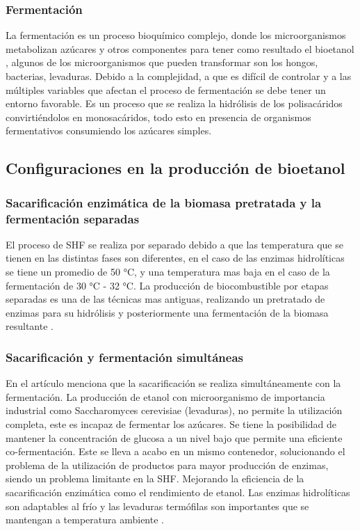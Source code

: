 \documentclass[12pt]{article}
\begin{document}
		
		
		\subsubsection{Fermentación}
		La fermentación es un proceso bioquímico complejo, donde los microorganismos metabolizan azúcares y otros componentes para tener como resultado el bioetanol \newline \cite{Escobar2019produccion}, algunos de los microorganismos que pueden transformar son los hongos, bacterias, levaduras. Debido a la complejidad, a que es difícil de controlar y a las múltiples variables que afectan el proceso de fermentación se debe tener un entorno favorable. \cite{rojas2010analisis}
		Es un proceso que se realiza la hidrólisis de los polisacáridos convirtiéndolos en monosacáridos, todo esto en presencia de organismos fermentativos consumiendo los azúcares simples.
		
		
		
		
		\subsection{Configuraciones en la producción de bioetanol}	
		\subsubsection{Sacarificación enzimática de la biomasa pretratada y la fermentación separadas}
		
		El proceso de SHF se realiza por separado debido a que las temperatura que se tienen en las distintas fases son diferentes, en el caso de las enzimas hidrolíticas se tiene un promedio de 50 °C, y una temperatura mas baja en el caso de la fermentación de 30 °C - 32 °C. 
		La producción de biocombustible por etapas separadas es una de las técnicas mas antiguas, realizando un pretratado de enzimas para su hidrólisis y posteriormente una fermentación de la biomasa resultante  \cite{CHOUDHARY201682}.
		
		
		
		
		\subsubsection{Sacarificación y fermentación simultáneas}
		
		En el artículo \cite{CHOUDHARY201682} menciona que la sacarificación se realiza simultáneamente con la fermentación.
		La producción de etanol con microorganismo de importancia industrial como Saccharomyces cerevisiae (levaduras), no permite la utilización completa, este es incapaz de fermentar los azúcares. Se tiene la posibilidad de mantener la concentración de glucosa a un nivel bajo que permite una eficiente co-fermentación.
		Este se lleva a acabo en un mismo contenedor, solucionando el problema de la utilización de productos para mayor producción de enzimas, siendo un problema limitante en la SHF. Mejorando la eficiencia de la sacarificación enzimática como el rendimiento de etanol. 
		Las enzimas hidrolíticas son adaptables al frío y las levaduras termófilas son importantes que se mantengan a temperatura ambiente \cite{CHOUDHARY201682}.
		
\end{document}
